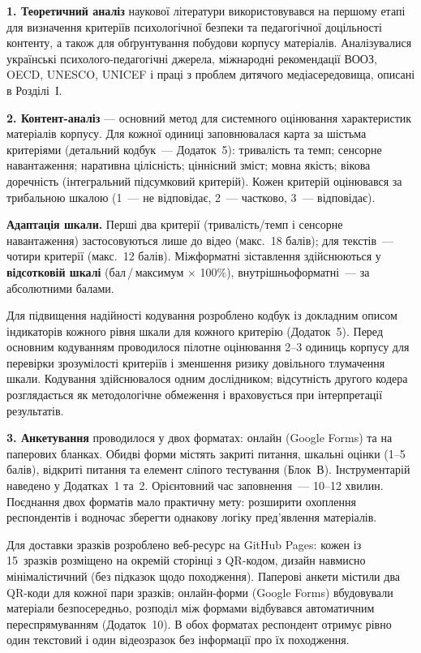 \documentclass[14pt, a4paper]{extreport}
\begin{document}
\textbf{1. Теоретичний аналіз} наукової літератури використовувався на першому етапі для визначення критеріїв психологічної безпеки та педагогічної доцільності контенту, а також для обґрунтування побудови корпусу матеріалів. Аналізувалися українські психолого-педагогічні джерела, міжнародні рекомендації ВООЗ, OECD, UNESCO, UNICEF і праці з проблем дитячого медіасередовища, описані в Розділі~І.

\textbf{2. Контент-аналіз} --- основний метод для системного оцінювання характеристик матеріалів корпусу. Для кожної одиниці заповнювалася карта за шістьма критеріями (детальний кодбук~--- Додаток~5): тривалість та темп; сенсорне навантаження; наративна цілісність; ціннісний зміст; мовна якість; вікова доречність (інтегральний підсумковий критерій). Кожен критерій оцінювався за трибальною шкалою (1~--- не відповідає, 2~--- частково, 3~--- відповідає).

\textbf{Адаптація шкали.}
Перші два критерії (тривалість/темп і сенсорне навантаження) застосовуються лише до відео (макс.~18 балів); для текстів~--- чотири критерії (макс.~12 балів). Міжформатні зіставлення здійснюються у \textbf{відсотковій шкалі} (бал\,/\,максимум × 100\%), внутрішньоформатні~--- за абсолютними балами.

Для підвищення надійності кодування розроблено кодбук із докладним описом індикаторів кожного рівня шкали для кожного критерію (Додаток~5). Перед основним кодуванням проводилося пілотне оцінювання 2--3 одиниць корпусу для перевірки зрозумілості критеріїв і зменшення ризику довільного тлумачення шкали. Кодування здійснювалося одним дослідником; відсутність другого кодера розглядається як методологічне обмеження і враховується при інтерпретації результатів.

\textbf{3. Анкетування} проводилося у двох форматах: онлайн (Google Forms) та на паперових бланках. Обидві форми містять закриті питання, шкальні оцінки (1--5 балів), відкриті питання та елемент сліпого тестування (Блок~В). Інструментарій наведено у Додатках~1 та~2. Орієнтовний час заповнення~--- 10--12 хвилин. Поєднання двох форматів мало практичну мету: розширити охоплення респондентів і водночас зберегти однакову логіку пред'явлення матеріалів.

Для доставки зразків розроблено веб-ресурс на GitHub Pages: кожен із 15~зразків розміщено на окремій сторінці з QR-кодом, дизайн навмисно мінімалістичний (без підказок щодо походження). Паперові анкети містили два QR-коди для кожної пари зразків; онлайн-форми (Google Forms) вбудовували матеріали безпосередньо, розподіл між формами відбувався автоматичним переспрямуванням (Додаток~10). В обох форматах респондент отримує рівно один текстовий і один відеозразок без інформації про їх походження.
\end{document}
